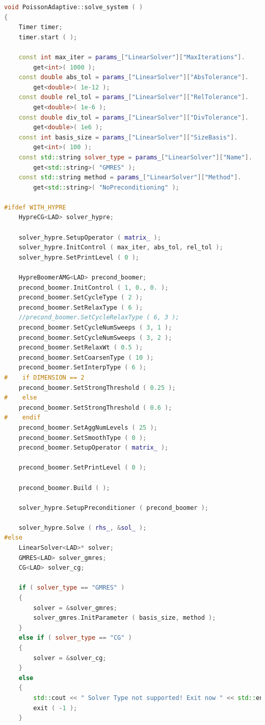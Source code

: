 \documentclass[a4paper, 11pt, twoside]{article}
\begin{document}
\begin{lstlisting}[language=C++, basicstyle={\footnotesize, \ttfamily}, keywordstyle=\color{blue}, numbers=none, tabsize=4]
void PoissonAdaptive::solve_system ( )
{
    Timer timer;
    timer.start ( );

    const int max_iter = params_["LinearSolver"]["MaxIterations"].
        get<int>( 1000 );
    const double abs_tol = params_["LinearSolver"]["AbsTolerance"].
        get<double>( 1e-12 );
    const double rel_tol = params_["LinearSolver"]["RelTolerance"].
        get<double>( 1e-6 );
    const double div_tol = params_["LinearSolver"]["DivTolerance"].
        get<double>( 1e6 );
    const int basis_size = params_["LinearSolver"]["SizeBasis"].
        get<int>( 100 );
    const std::string solver_type = params_["LinearSolver"]["Name"].
        get<std::string>( "GMRES" );
    const std::string method = params_["LinearSolver"]["Method"].
        get<std::string>( "NoPreconditioning" );

#ifdef WITH_HYPRE
    HypreCG<LAD> solver_hypre;

    solver_hypre.SetupOperator ( matrix_ );
    solver_hypre.InitControl ( max_iter, abs_tol, rel_tol );
    solver_hypre.SetPrintLevel ( 0 );

    HypreBoomerAMG<LAD> precond_boomer;
    precond_boomer.InitControl ( 1, 0., 0. );
    precond_boomer.SetCycleType ( 2 );
    precond_boomer.SetRelaxType ( 6 );
    //precond_boomer.SetCycleRelaxType ( 6, 3 );
    precond_boomer.SetCycleNumSweeps ( 3, 1 );
    precond_boomer.SetCycleNumSweeps ( 3, 2 );
    precond_boomer.SetRelaxWt ( 0.5 );
    precond_boomer.SetCoarsenType ( 10 );
    precond_boomer.SetInterpType ( 6 );
#    if DIMENSION == 2
    precond_boomer.SetStrongThreshold ( 0.25 );
#    else
    precond_boomer.SetStrongThreshold ( 0.6 );
#    endif
    precond_boomer.SetAggNumLevels ( 25 );
    precond_boomer.SetSmoothType ( 0 );
    precond_boomer.SetupOperator ( matrix_ );

    precond_boomer.SetPrintLevel ( 0 );

    precond_boomer.Build ( );

    solver_hypre.SetupPreconditioner ( precond_boomer );

    solver_hypre.Solve ( rhs_, &sol_ );
#else
    LinearSolver<LAD>* solver;
    GMRES<LAD> solver_gmres;
    CG<LAD> solver_cg;

    if ( solver_type == "GMRES" )
    {
        solver = &solver_gmres;
        solver_gmres.InitParameter ( basis_size, method );
    }
    else if ( solver_type == "CG" )
    {
        solver = &solver_cg;
    }
    else
    {
        std::cout << " Solver Type not supported! Exit now " << std::endl;
        exit ( -1 );
    }


\end{lstlisting}
\end{document}
